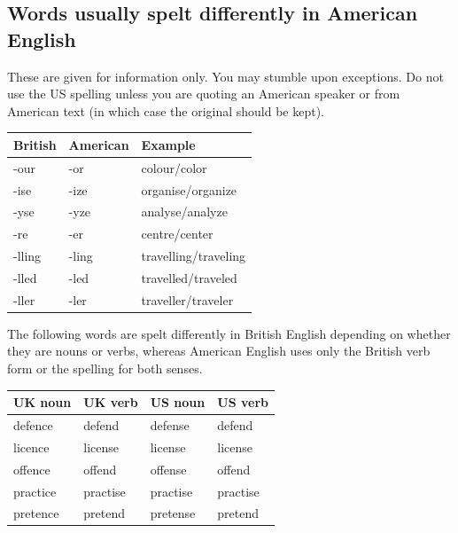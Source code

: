 \documentclass[11pt,a4paper]{book}
\begin{document}
				\subsection{Words usually spelt differently in American English}
				These are given for information only. You may stumble upon exceptions. Do not use the US spelling unless you are quoting an American speaker or from American text (in which case the original should be kept).
					{\small 
						\renewcommand*{\arraystretch}{1.8}
						\begin{longtable}{p{2cm} | p{2cm} | p{7cm}}
							\toprule
							\textbf{British} &\textbf{American} & \multicolumn{1}{l}{\textbf{Example}} \\
							\midrule
							
							\noindent 
							-our & -or & colour/color\\ 
							\noindent 
							-ise & -ize & organise/organize  \\
							\noindent 
							-yse & -yze & analyse/analyze \\
							\noindent 
							-re & -er & centre/center \\
							\noindent 
							-lling & -ling & travelling/traveling \\
							\noindent 
							-lled & -led & travelled/traveled\\
							\noindent 
							-ller & -ler & traveller/traveler \\
							\bottomrule
						\end{longtable}
					}
				The following words are spelt differently in British English depending on whether they are nouns or verbs, whereas American English uses only the British verb form or the spelling for both senses.
				{\small 
					\renewcommand*{\arraystretch}{1.8}
					\begin{longtable}{p{2.5cm} | p{2.5cm} | p{2.5cm} | p{2.5cm}}
						\toprule
						\textbf{UK noun} &\textbf{UK verb} & \textbf{US noun} & \textbf{US verb}  \\
						\midrule
						
						\noindent 
						defence & defend & defense & defend \\ 
						\noindent 
						licence & license & license & license \\
						\noindent 
						offence & offend & offense & offend \\
						\noindent 
						practice & practise & practise & practise\\
						\noindent 
						pretence & pretend & pretense & pretend\\
						\bottomrule
					\end{longtable}
				}
\end{document}
